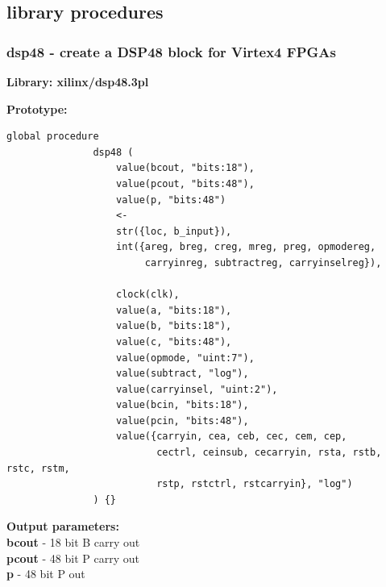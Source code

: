     \subsection{library procedures}

        \subsubsection{dsp48 - create a DSP48 block for Virtex4 FPGAs}\label{sec:lpdsp48}

            {\bf Library: xilinx/dsp48.3pl}
            
            {\bf Prototype:} \\
            \vsp
            \begin{lstlisting}[gobble=12, language=threepl]
               global procedure
               dsp48 (
                   value(bcout, "bits:18"),
                   value(pcout, "bits:48"),
                   value(p, "bits:48")
                   <-   
                   str({loc, b_input}),
                   int({areg, breg, creg, mreg, preg, opmodereg,
                        carryinreg, subtractreg, carryinselreg}),

                   clock(clk),
                   value(a, "bits:18"),
                   value(b, "bits:18"),
                   value(c, "bits:48"),
                   value(opmode, "uint:7"),
                   value(subtract, "log"),
                   value(carryinsel, "uint:2"),
                   value(bcin, "bits:18"),
                   value(pcin, "bits:48"),
                   value({carryin, cea, ceb, cec, cem, cep,
                          cectrl, ceinsub, cecarryin, rsta, rstb, rstc, rstm,
                          rstp, rstctrl, rstcarryin}, "log")
               ) {}
            \end{lstlisting}

            {\bf Output parameters:} \\
            {\bf bcout} - 18 bit B carry out   \\
            {\bf pcout} - 48 bit P carry out  \\
            {\bf p} - 48 bit P out    \\

